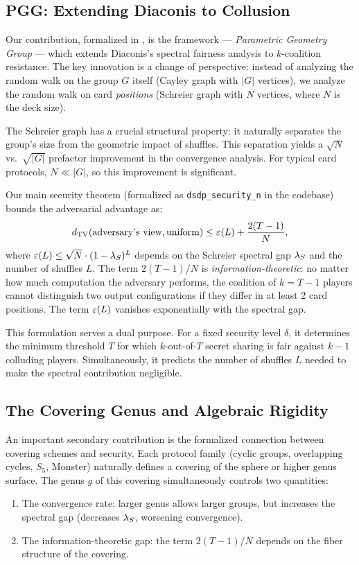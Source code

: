 \documentclass[11pt,a4paper]{article}
\begin{document}
\subsection*{PGG: Extending Diaconis to Collusion}

Our contribution, formalized in \Rocq, is the \pgg framework — \textit{Parametric Geometry Group} — which extends Diaconis's spectral fairness analysis to $k$-coalition resistance.
The key innovation is a change of perspective: instead of analyzing the random walk on the group $G$ itself (Cayley graph with $|G|$ vertices), we analyze the random walk on card \emph{positions} (Schreier graph with $N$ vertices, where $N$ is the deck size).

The Schreier graph has a crucial structural property: it naturally separates the group's size from the geometric impact of shuffles.
This separation yields a $\sqrt{N}$ vs.\ $\sqrt{|G|}$ prefactor improvement in the convergence analysis.
For typical card protocols, $N \ll |G|$, so this improvement is significant.

Our main security theorem (formalized as \texttt{dsdp\_security\_n} in the \Rocq codebase) bounds the adversarial advantage as:
\[
  d_{\mathrm{TV}}(\text{adversary's view}, \text{uniform}) \leq \varepsilon(L) + \frac{2(T-1)}{N},
\]
where $\varepsilon(L) \leq \sqrt{N} \cdot (1 - \lambda_S)^L$ depends on the Schreier spectral gap $\lambda_S$ and the number of shuffles $L$.
The term $2(T-1)/N$ is \emph{information-theoretic}: no matter how much computation the adversary performs, the coalition of $k = T-1$ players cannot distinguish two output configurations if they differ in at least 2 card positions.
The term $\varepsilon(L)$ vanishes exponentially with the spectral gap.

This formulation serves a dual purpose.
For a fixed security level $\delta$, it determines the minimum threshold $T$ for which $k$-out-of-$T$ secret sharing is fair against $k-1$ colluding players.
Simultaneously, it predicts the number of shuffles $L$ needed to make the spectral contribution negligible.

\subsection*{The Covering Genus and Algebraic Rigidity}

An important secondary contribution is the formalized connection between covering schemes and security.
Each protocol family (cyclic groups, overlapping cycles, $S_5$, Monster) naturally defines a covering of the sphere or higher genus surface.
The genus $g$ of this covering simultaneously controls two quantities:
\begin{enumerate}
  \item The convergence rate: larger genus allows larger groups, but increases the spectral gap (decreases $\lambda_S$, worsening convergence).
  \item The information-theoretic gap: the term $2(T-1)/N$ depends on the fiber structure of the covering.
\end{enumerate}
\end{document}
